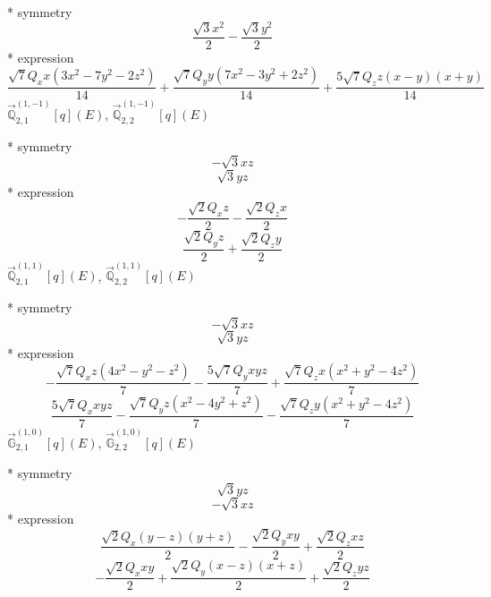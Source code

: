 \documentclass[fleqn,8pt]{jsarticle}
\begin{document}
\noindent\quad ** symmetry
\begin{dmath*}
\frac{\sqrt{3} x^{2}}{2} - \frac{\sqrt{3} y^{2}}{2}
\end{dmath*}
\noindent\quad ** expression
\begin{dmath*}
\frac{\sqrt{7} Q_{x} x \left(3 x^{2} - 7 y^{2} - 2 z^{2}\right)}{14} + \frac{\sqrt{7} Q_{y} y \left(7 x^{2} - 3 y^{2} + 2 z^{2}\right)}{14} + \frac{5 \sqrt{7} Q_{z} z \left(x - y\right) \left(x + y\right)}{14}
\end{dmath*}
\noindent\quad $\vec{\mathbb{Q}}_{2,1}^{(1,-1)}[q](E)$, $\vec{\mathbb{Q}}_{2,2}^{(1,-1)}[q](E)$

\noindent\quad ** symmetry
\begin{dmath*}
- \sqrt{3} x z
\end{dmath*}
\begin{dmath*}
\sqrt{3} y z
\end{dmath*}
\noindent\quad ** expression
\begin{dmath*}
- \frac{\sqrt{2} Q_{x} z}{2} - \frac{\sqrt{2} Q_{z} x}{2}
\end{dmath*}
\begin{dmath*}
\frac{\sqrt{2} Q_{y} z}{2} + \frac{\sqrt{2} Q_{z} y}{2}
\end{dmath*}
\noindent\quad $\vec{\mathbb{Q}}_{2,1}^{(1,1)}[q](E)$, $\vec{\mathbb{Q}}_{2,2}^{(1,1)}[q](E)$

\noindent\quad ** symmetry
\begin{dmath*}
- \sqrt{3} x z
\end{dmath*}
\begin{dmath*}
\sqrt{3} y z
\end{dmath*}
\noindent\quad ** expression
\begin{dmath*}
- \frac{\sqrt{7} Q_{x} z \left(4 x^{2} - y^{2} - z^{2}\right)}{7} - \frac{5 \sqrt{7} Q_{y} x y z}{7} + \frac{\sqrt{7} Q_{z} x \left(x^{2} + y^{2} - 4 z^{2}\right)}{7}
\end{dmath*}
\begin{dmath*}
\frac{5 \sqrt{7} Q_{x} x y z}{7} - \frac{\sqrt{7} Q_{y} z \left(x^{2} - 4 y^{2} + z^{2}\right)}{7} - \frac{\sqrt{7} Q_{z} y \left(x^{2} + y^{2} - 4 z^{2}\right)}{7}
\end{dmath*}
\noindent\quad $\vec{\mathbb{G}}_{2,1}^{(1,0)}[q](E)$, $\vec{\mathbb{G}}_{2,2}^{(1,0)}[q](E)$

\noindent\quad ** symmetry
\begin{dmath*}
\sqrt{3} y z
\end{dmath*}
\begin{dmath*}
- \sqrt{3} x z
\end{dmath*}
\noindent\quad ** expression
\begin{dmath*}
\frac{\sqrt{2} Q_{x} \left(y - z\right) \left(y + z\right)}{2} - \frac{\sqrt{2} Q_{y} x y}{2} + \frac{\sqrt{2} Q_{z} x z}{2}
\end{dmath*}
\begin{dmath*}
- \frac{\sqrt{2} Q_{x} x y}{2} + \frac{\sqrt{2} Q_{y} \left(x - z\right) \left(x + z\right)}{2} + \frac{\sqrt{2} Q_{z} y z}{2}
\end{dmath*}
\end{document}
